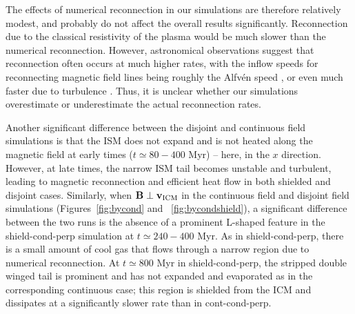 \documentclass[twocolumn]{aastex6}
\begin{document}
The effects of numerical reconnection in our simulations are therefore relatively modest, and probably do not affect the overall results significantly. Reconnection due to the classical resistivity of the plasma would be much slower than the numerical reconnection.  However, astronomical observations suggest that reconnection often occurs at much higher rates, with the inflow speeds for reconnecting magnetic field lines being roughly the Alfv\'{e}n speed \citep{Petschek64}, or even much faster due to turbulence \citep{Kowal09}.  Thus, it is unclear whether our simulations overestimate or underestimate the actual reconnection rates.

Another significant difference between the disjoint and continuous field simulations is that the ISM does not expand and is not heated along the magnetic field at early times ($t \simeq 80 - 400$ Myr) -- here, in the $x$ direction. However, at late times, the narrow ISM tail becomes unstable and turbulent, leading to magnetic reconnection and efficient heat flow in both shielded and disjoint cases. Similarly, when $\mathbf{B} \perp \mathbf{v_{\rm ICM}}$ in the continuous field and disjoint field simulations (Figures~\ref{fig:bycond} and ~\ref{fig:bycondshield}), a significant difference between the two runs is the absence of a prominent L-shaped feature in the shield-cond-perp simulation at $t \simeq 240 - 400$ Myr. As in shield-cond-perp, there is a small amount of cool gas that flows through a narrow region due to numerical reconnection. At $t \simeq 800$ Myr in shield-cond-perp, the stripped double winged tail is prominent and has not expanded and evaporated as in the corresponding continuous case; this region is shielded from the ICM and dissipates at a significantly slower rate than in cont-cond-perp.
\end{document}
